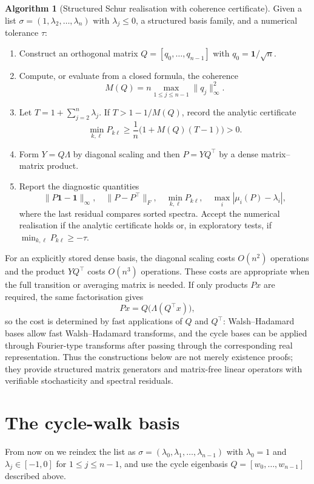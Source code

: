 \documentclass[12pt,fleqn]{amsart}
\renewcommand{\le}{\leqslant}
\renewcommand{\ge}{\geqslant}
\theoremstyle{definition}
\newtheorem{alg}[thm]{Algorithm}
\theoremstyle{remark}
\newcommand{\1}{\mathbf{1}}
\begin{document}
\begin{alg}[Structured Schur realisation with coherence certificate]\label{alg:schur}
Given a list $\sigma=(1,\lambda_2,\ldots,\lambda_n)$ with $\lambda_j\le0$, a structured basis family, and a numerical tolerance $\tau$:
\begin{enumerate}[leftmargin=*,itemsep=2pt]
\item Construct an orthogonal matrix $Q=[q_0,\ldots,q_{n-1}]$ with $q_0=\mathbf 1/\sqrt n$.
\item Compute, or evaluate from a closed formula, the coherence
\[
        M(Q)=n\max_{1\le j\le n-1}\|q_j\|_{\infty}^2.
\]
\item Let $T=1+\sum_{j=2}^n\lambda_j$.  If $T>1-1/M(Q)$, record the analytic certificate
\[
        \min_{k,\ell}P_{k\ell}\ge \frac{1}{n}\bigl(1+M(Q)(T-1)\bigr)>0.
\]
\item Form $Y=Q\Lambda$ by diagonal scaling and then $P=YQ^{\top}$ by a dense matrix--matrix product.
\item Report the diagnostic quantities
\[
\|P\mathbf 1-\mathbf 1\|_{\infty},\quad
\|P-P^{\top}\|_{F},\quad
\min_{k,\ell}P_{k\ell},\quad
\max_i |\mu_i(P)-\lambda_i|,
\]
where the last residual compares sorted spectra.  Accept the numerical realisation if the analytic certificate holds or, in exploratory tests, if $\min_{k,\ell}P_{k\ell}\ge-\tau$.
\end{enumerate}
\end{alg}

For an explicitly stored dense basis, the diagonal scaling costs $O(n^2)$ operations and the product $YQ^{\top}$ costs $O(n^3)$ operations.  These costs are appropriate when the full transition or averaging matrix is needed.  If only products $Px$ are required, the same factorisation gives
\[
        Px=Q\bigl(\Lambda(Q^{\top}x)\bigr),
\]
so the cost is determined by fast applications of $Q$ and $Q^{\top}$: Walsh--Hadamard bases allow fast Walsh--Hadamard transforms, and the cycle bases can be applied through Fourier-type transforms after passing through the corresponding real representation.  Thus the constructions below are not merely existence proofs; they provide structured matrix generators and matrix-free linear operators with verifiable stochasticity and spectral residuals.

\section{The cycle-walk basis}\label{sec:cycle}
From now on we reindex the list as $\sigma=(\lambda_0,\lambda_1,\ldots,\lambda_{n-1})$ with $\lambda_0=1$ and $\lambda_j\in[-1,0]$ for $1\le j\le n-1$, and use the cycle eigenbasis $Q=[w_0,\dots,w_{n-1}]$ described above.
\end{document}
